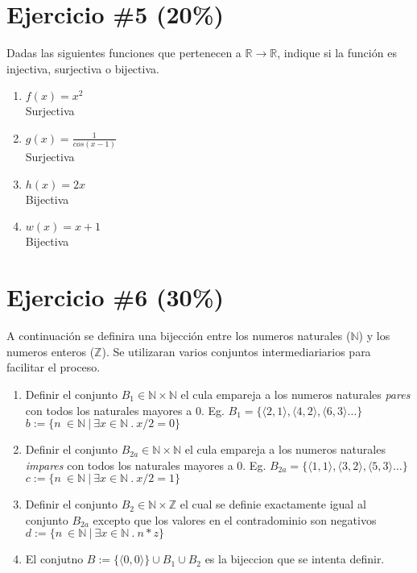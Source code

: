 \documentclass[10pt,a4paper]{article}
\begin{document}
\section*{Ejercicio \#5 (20\%)}
Dadas las siguientes funciones que pertenecen a $\mathbb{R}\rightarrow \mathbb{R}$, indique
si la funci\'on es injectiva, surjectiva o bijectiva.
\begin{enumerate}
        \item{$f(x)=x^2$} \\
        Surjectiva \\ 
        \item{$g(x)=\frac{1}{cos(x-1)}$} \\
        Surjectiva\\
        \item{$h(x)=2x$} \\
        Bijectiva\\
        \item{$w(x)=x+1$}\\
        Bijectiva\\
\end{enumerate}
\section*{Ejercicio \#6 (30\%)}
A continuaci\'on se definira una bijecci\'on entre los numeros naturales ($\mathbb{N}$) y los
numeros enteros ($\mathbb{Z}$). Se utilizaran varios conjuntos intermediariarios para facilitar
el proceso.
\begin{enumerate}
        \item{Definir el conjunto $B_1\in \mathbb{N}\times\mathbb{N}$ el cula empareja a los
        numeros naturales \emph{pares} con todos los naturales mayores a $0$. Eg. $B_1=\{
        \langle 2,1 \rangle, \langle 4,2 \rangle, \langle 6, 3 \rangle\ldots \}$} \\
        $b:=\{n\ \in \mathbb{N}\ |\ \exists x \in \mathbb{N}\ .\ x/2=0 \}$\\
        \item{Definir el conjunto $B_{2a}\in \mathbb{N}\times\mathbb{N}$ el cula empareja a los
        numeros naturales \emph{impares} con todos los naturales mayores a $0$. Eg. $B_{2a}=\{
        \langle 1,1 \rangle, \langle 3,2 \rangle, \langle 5, 3 \rangle\ldots \}$} \\
         $c:=\{n\ \in \mathbb{N}\ |\ \exists x \in \mathbb{N}\ .\ x/2=1 \}$\\
        \item{Definir el conjunto $B_{2}\in \mathbb{N}\times\mathbb{Z}$ el cual se definie
        exactamente igual al conjunto $B_{2a}$ excepto que los valores en el contradominio
        son negativos}
         $d:=\{n\ \in \mathbb{N}\ |\ \exists x \in \mathbb{N}\ .\ n * z \}$\\
        \item{El conjutno $B:= \{\langle 0,0\rangle \}\cup B_{1} \cup B_{2}$ es la bijeccion
        que se intenta definir.}
\end{enumerate}
\end{document}
